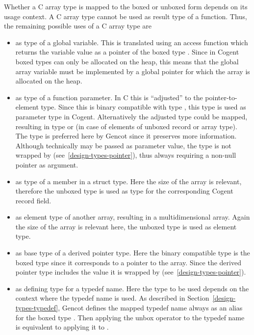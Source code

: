 Whether a C array type is mapped to the boxed or unboxed form depends on its usage context.
A C array type cannot be used as result type of a function. Thus, the remaining possible uses of a C array type are
\begin{itemize}
\item as type of a global variable. This is translated using an access function which returns the variable
value as a pointer of the boxed type . Since in Cogent boxed types
can only be allocated on the heap, this means that the global array variable must be implemented by a global pointer
for which the array is allocated on the heap.
\item as type of a function parameter. In C this is ``adjusted'' to the pointer-to-element type. Since this
is binary compatible with type , this type is used as parameter type in Cogent. Alternatively 
the adjusted type could be mapped, resulting in type  or  (in case of elements of unboxed 
record or array type). The type  is preferred here by Gencot since it preserves more information.
Although technically  may be passed as parameter value, the type is not wrapped by  
(see~\ref{design-types-pointer}), thus always requiring a non-null pointer as argument.
\item as type of a member in a struct type. Here the size of the array is relevant, therefore the unboxed type
 is used as type for the corresponding Cogent record field.
\item as element type of another array, resulting in a multidimensional array. Again the size of the array 
is relevant here, the unboxed type  is used as element type.
\item as base type of a derived pointer type. Here the binary compatible type is the boxed type 
since it corresponds to a pointer to the array. Since the derived pointer type includes the  value
it is wrapped by  (see~\ref{design-types-pointer}).
\item as defining type for a typedef name. Here the type to be used depends on the context where the typedef
name is used. As described in Section~\ref{design-types-typedef}, Gencot defines the mapped 
typedef name always as an alias for the boxed type . Then applying the unbox operator to the typedef name 
is equivalent to applying it to .
\end{itemize}

